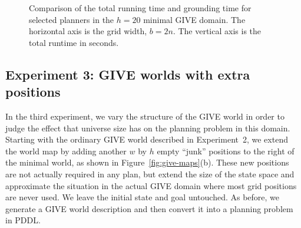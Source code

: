 \begin{figure}[t]
  \caption{Comparison of the total running time and grounding time for selected
  planners in the $h=20$ minimal GIVE domain. The horizontal axis is the grid
  width, $b = 2n$. The vertical axis is the total runtime in seconds.}
  \label{fig:give-minimal-grounding}
\end{figure}

\subsection{Experiment 3: GIVE worlds with extra positions}
\label{sec:experiment-3:-give}

In the third experiment, we vary the structure of the GIVE world in order
to judge the effect that universe size has on the planning problem in this
domain. Starting with the ordinary GIVE world described in Experiment~2, we
extend the world map by adding another $w$ by $h$ empty ``junk'' positions
to the right of the minimal world, as shown in Figure~\ref{fig:give-maps}(b).
These new positions are not actually required in any plan, but extend the
size of the state space and approximate the situation in the actual GIVE
domain where most grid positions are never used. We leave the initial state
and goal untouched. As before, we generate a GIVE world description and
then convert it into a planning problem in PDDL.


